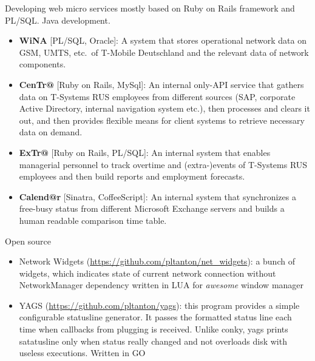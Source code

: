 \documentclass{cv}
\begin{document}
\begin{cvblock}{%
  }

  Developing web micro services mostly based on Ruby on Rails framework and PL/SQL\@.
  Java development.

  \begin{itemize}
    \item \textbf{WiNA} [PL/SQL, Oracle]:
      A system that stores operational network data on GSM,
      UMTS, etc.\ of T-Mobile Deutschland and the relevant data of
      network components.

    \item \textbf{CenTr@} [Ruby on Rails, MySql]:
      An internal only-API service that gathers data on T-Systems RUS employees
      from different sources (SAP, corporate Active Directory,
      internal navigation system etc.), then processes and clears it out, and
      then provides flexible means for client systems to retrieve necessary
      data on demand.

    \item \textbf{ExTr@} [Ruby on Rails, PL/SQL]:
      An internal system that enables managerial personnel to track overtime
      and (extra-)events of T-Systems RUS employees and then build reports and
      employment forecasts.

    \item \textbf{Calend@r} [Sinatra, CoffeeScript]:
      An internal system that synchronizes a free-busy status from different
      Microsoft Exchange servers and builds a human readable comparison time
      table.
  \end{itemize}
\end{cvblock}

\vspace{2em}

\begin{cvblock}{Open source}
  \begin{itemize}
    \item Network Widgets
      (\url{https://github.com/pltanton/net_widgets}):
                        a bunch of widgets, which indicates state of current network connection
      without NetworkManager dependency written in LUA for
      \textit{awesome} window manager
    \item YAGS
      (\url{https://github.com/pltanton/yags}):
      this program provides a simple configurable statusline generator. It
      passes the formatted status line each time when callbacks from plugging
      is received. Unlike conky, yags prints satatusline only when status
      really changed and not overloads disk with useless executions. Written in
      GO

  \end{itemize}
\end{cvblock}
\end{document}
